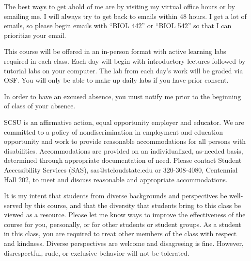 \documentclass{tufte-handout}
\begin{document}
\begin{fullwidth}

 The best ways to get ahold of me are by visiting my virtual office hours or by emailing me. I will always try to get back to emails within 48 hours. I get a lot of emails, so please begin emails with ``BIOL 442'' or ``BIOL 542'' so that I can prioritize your email.

 This course will be offered in an in-person format with active learning labs required in each class. Each day will begin with introductory lectures followed by tutorial labs on your computer. The lab from each day's work will be graded via OSF. You will only be able to make up daily labs if you have prior consent. 


\color{blue}
In order to have an excused absence, you must notify me prior to the beginning of class of your absence. 
\color{black}


 SCSU is an affirmative action, equal opportunity employer and educator. We are committed to a policy of nondiscrimination in employment and education opportunity and work to provide reasonable accommodations for all persons with disabilities. Accommodations are provided on an individualized, as-needed basis, determined through appropriate documentation of need. Please contact Student Accessibility Services (SAS), sas@stcloudstate.edu or 320-308-4080, Centennial Hall 202, to meet and discuss reasonable and appropriate accommodations. 

 It is my intent that students from diverse backgrounds and perspectives be well-served by this course, and that the diversity that students bring to this class be viewed as a resource. Please let me know ways to improve the effectiveness of the course for you, personally, or for other students or student groups. As a student in this class, you are required to treat other members of the class with respect and kindness. Diverse perspectives are welcome and disagreeing is fine. However, disrespectful, rude, or exclusive behavior will not be tolerated.


\end{fullwidth}
\end{document}
